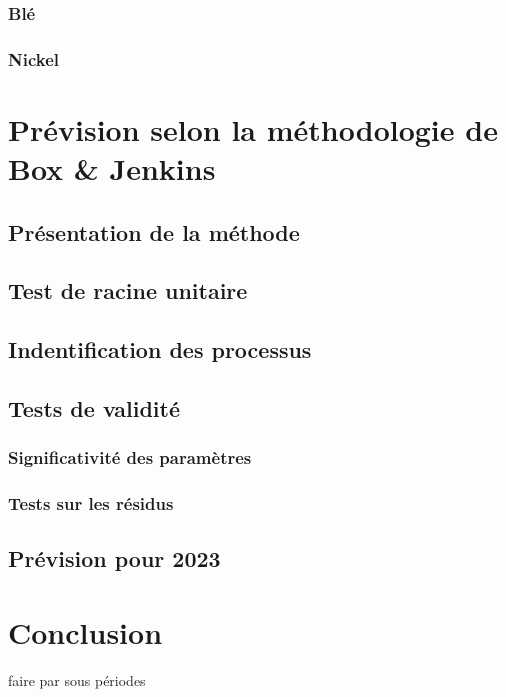 \documentclass[11pt,a4paper]{article}
\begin{document}
\subsubsection{Blé}
\subsubsection{Nickel}
\section{Prévision selon la méthodologie de Box \& Jenkins}
\subsection{Présentation de la méthode}
\subsection{Test de racine unitaire}
\subsection{Indentification des processus}
\subsection{Tests de validité}
\subsubsection{Significativité des paramètres}
\subsubsection{Tests sur les résidus}
\subsection{Prévision pour 2023}
\section*{Conclusion}


faire par sous périodes
\end{document}
